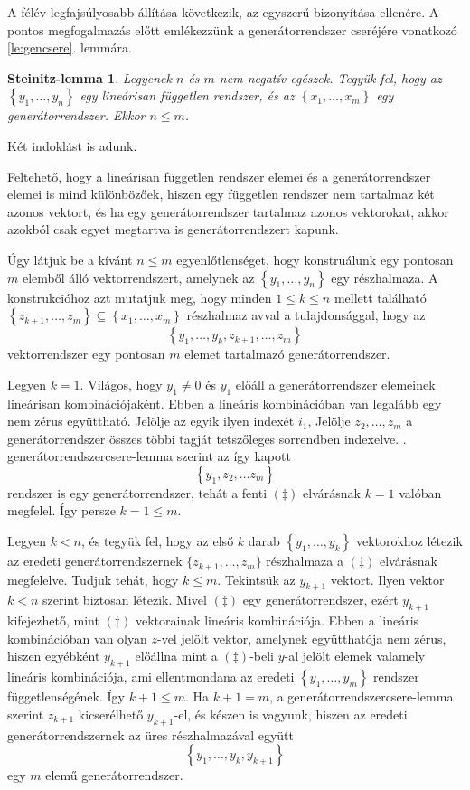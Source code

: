 \documentclass[a4paper, showtrims]{memoir}
\makeatletter
\renewenvironment{proof}[1][\proofname]
    {\par\pushQED{\qed}%
    \normalfont \topsep6\p@\@plus6\p@\relax
    \trivlist
    \item[\hskip\labelsep
        \itshape
    #1\@addpunct{:}]\ignorespaces}
    {\popQED\endtrivlist\@endpefalse}
\theoremstyle{plain}
\newtheorem*{SL}{Steinitz-lemma}
\theoremstyle{remark}
\theoremstyle{definition}
\makeatother
\begin{document}
A félév legfajsúlyosabb állítása következik, az egyszerű bizonyítása ellenére.
A pontos megfogalmazás előtt emlékezzünk a generátorrendszer cseréjére vonatkozó \ref{le:gencsere}. lemmára.
\begin{SL}
	Legyenek $n$ és $m$ nem negatív egészek.
	Tegyük fel, hogy az $\left\{ y_1,\ldots,y_n \right\}$ egy lineárisan független rendszer,
	és az
	$\left\{ x_1,\ldots,x_m \right\}$ egy generátorrendszer.
	Ekkor $n\leq m$. \label{le:Steinitz}
\end{SL}
Két indoklást is adunk.
\begin{proof}
    Feltehető, hogy a lineárisan független rendszer elemei és a generátorrendszer elemei is mind különbözőek,
    hiszen egy független rendszer nem tartalmaz két azonos vektort, és ha egy generátorrendszer tartalmaz azonos vektorokat,
    akkor azokból csak egyet megtartva is generátorrendszert kapunk.

    Úgy látjuk be a kívánt $n\leq m$ egyenlőtlenséget, hogy konstruálunk egy pontosan $m$ elemből álló
    vektorrendszert, amelynek az $\left\{ y_1,\ldots,y_n \right\}$ egy részhalmaza.
    A konstrukcióhoz azt mutatjuk meg, 
    hogy minden $1\leq k\leq n$ mellett található 
    $\left\{ z_{k+1},\ldots,z_m \right\}\subseteq \left\{ x_1,\ldots,x_m \right\}$
    részhalmaz avval a tulajdonsággal, hogy az 
    \[
        \left\{ y_1,\dots,y_k,z_{k+1},\ldots, z_m \right\}\tag{\ddag}
    \]
    vektorrendszer egy pontosan $m$ elemet tartalmazó generátorrendszer.

    Legyen $k=1$.
    Világos, hogy $y_1\neq 0$ és $y_1$ előáll a generátorrendszer elemeinek lineárisan kombinációjaként.
    Ebben a lineáris kombinációban van legalább egy nem zérus együttható. Jelölje az egyik ilyen indexét $i_1$,
    Jelölje $z_2,\ldots, z_m$ a generátorrendszer összes többi tagját tetszőleges sorrendben indexelve.
    . generátorrendszercsere-lemma szerint az így kapott 
    \[
        \left\{ y_1,z_2,\ldots z_m \right\}
    \]
    rendszer is egy generátorrendszer, tehát a fenti $(\ddag)$ elvárásnak $k=1$ valóban megfelel. 
    Így persze $k=1\leq m$.

    Legyen $k<n$, és tegyük fel, hogy az első $k$ darab $\left\{ y_1,\ldots,y_k \right\}$ vektorokhoz létezik az eredeti generátorrendszernek
    $\{z_{k+1},\ldots,z_m\}$ részhalmaza a $(\ddag)$ elvárásnak megfelelve. 
    Tudjuk tehát, hogy $k\leq m$.
    Tekintsük az $y_{k+1}$ vektort. 
    Ilyen vektor $k<n$ szerint biztosan létezik.
    Mivel $(\ddag)$ egy generátorrendszer, ezért $y_{k+1}$ kifejezhető, mint $(\ddag)$ vektorainak lineáris kombinációja.
    Ebben a lineáris kombinációban van olyan $z$-vel jelölt vektor, amelynek együtthatója nem zérus,
    hiszen egyébként $y_{k+1}$ előállna mint a $(\ddag)$-beli $y$-al jelölt elemek valamely lineáris kombinációja,
    ami ellentmondana az eredeti $\left\{ y_1,\ldots,y_m \right\}$ rendszer függetlenségének.
    Így $k+1\leq m$.
    Ha $k+1=m$, a generátorrendszercsere-lemma szerint $z_{k+1}$ kicserélhető $y_{k+1}$-el,
    és készen is vagyunk, hiszen az eredeti generátorrendszernek az üres részhalmazával együtt
    \[
        \left\{ y_1,\dots,y_k,y_{k+1} \right\}
    \]
    egy $m$ elemű generátorrendszer.


\end{proof}
\end{document}
